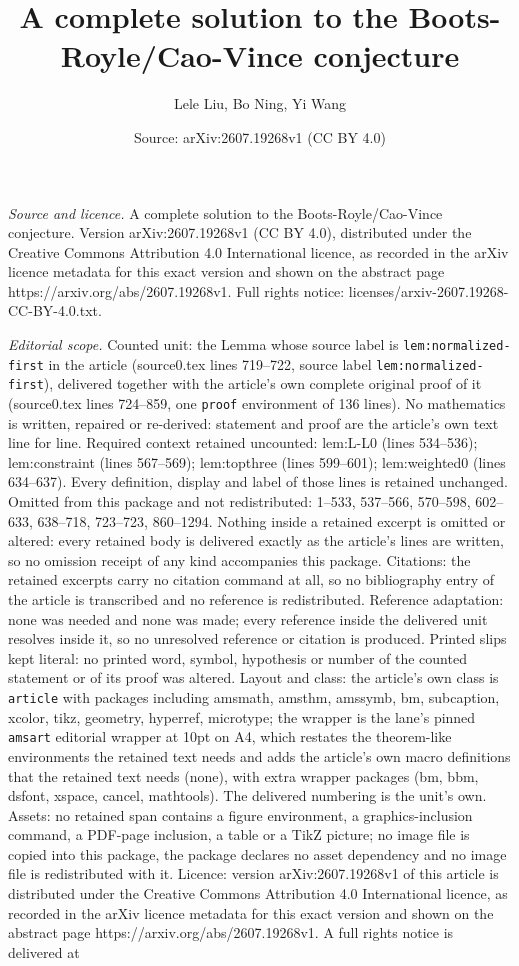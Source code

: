 \documentclass[10pt,a4paper]{amsart}
\title[A complete solution to the Boots-Royle/Cao-Vince conjecture]{A complete solution to the Boots-Royle/Cao-Vince conjecture}
\author{Lele Liu, Bo Ning, Yi Wang}
\date{Source: arXiv:2607.19268v1 (CC BY 4.0)}
\begin{document}
\maketitle

\noindent\emph{Source and licence.} A complete solution to the Boots-Royle/Cao-Vince conjecture. Version arXiv:2607.19268v1 (CC BY 4.0), distributed under the Creative Commons Attribution 4.0 International licence, as recorded in the arXiv licence metadata for this exact version and shown on the abstract page https://arxiv.org/abs/2607.19268v1. Full rights notice: licenses/arxiv-2607.19268-CC-BY-4.0.txt.\par\smallskip

\noindent\textit{Editorial scope.} Counted unit: the Lemma whose source label is \texttt{lem:normalized-first} in the article (source0.tex lines 719--722, source label \texttt{lem:normalized-first}), delivered together with the article's own complete original proof of it (source0.tex lines 724--859, one \texttt{proof} environment of 136 lines). No mathematics is written, repaired or re-derived: statement and proof are the article's own text line for line. Required context retained uncounted: lem:L-L0 (lines 534--536); lem:constraint (lines 567--569); lem:topthree (lines 599--601); lem:weighted0 (lines 634--637). Every definition, display and label of those lines is retained unchanged. Omitted from this package and not redistributed: 1--533, 537--566, 570--598, 602--633, 638--718, 723--723, 860--1294. Nothing inside a retained excerpt is omitted or altered: every retained body is delivered exactly as the article's lines are written, so no omission receipt of any kind accompanies this package. Citations: the retained excerpts carry no citation command at all, so no bibliography entry of the article is transcribed and no reference is redistributed. Reference adaptation: none was needed and none was made; every reference inside the delivered unit resolves inside it, so no unresolved reference or citation is produced. Printed slips kept literal: no printed word, symbol, hypothesis or number of the counted statement or of its proof was altered. Layout and class: the article's own class is \texttt{article} with packages including amsmath, amsthm, amssymb, bm, subcaption, xcolor, tikz, geometry, hyperref, microtype; the wrapper is the lane's pinned \texttt{amsart} editorial wrapper at 10pt on A4, which restates the theorem-like environments the retained text needs and adds the article's own macro definitions that the retained text needs (none), with extra wrapper packages (bm, bbm, dsfont, xspace, cancel, mathtools). The delivered numbering is the unit's own. Assets: no retained span contains a figure environment, a graphics-inclusion command, a PDF-page inclusion, a table or a TikZ picture; no image file is copied into this package, the package declares no asset dependency and no image file is redistributed with it. Licence: version arXiv:2607.19268v1 of this article is distributed under the Creative Commons Attribution 4.0 International licence, as recorded in the arXiv licence metadata for this exact version and shown on the abstract page https://arxiv.org/abs/2607.19268v1. A full rights notice is delivered at 
\end{document}
